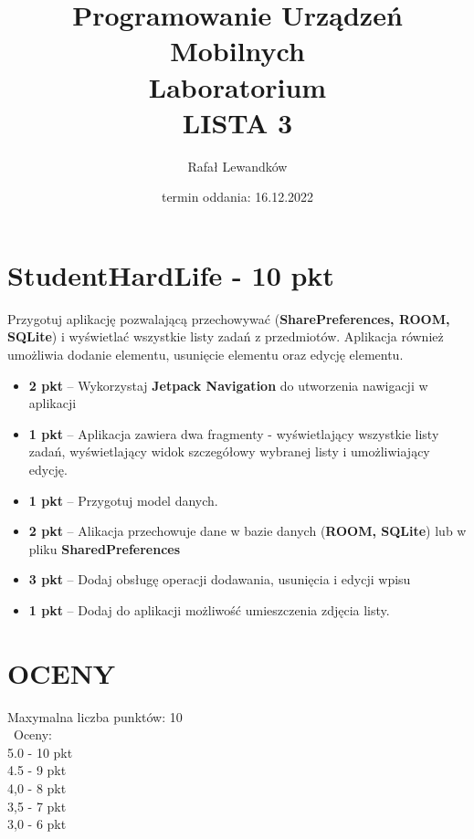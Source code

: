 \documentclass[a4paper]{article}
\title{Programowanie Urządzeń Mobilnych \\ Laboratorium \\ \textbf{LISTA 3}}
\author{Rafał Lewandków}
\date{termin oddania: 16.12.2022}
\begin{document}
\maketitle
    

\section*{StudentHardLife - 10 pkt}

Przygotuj aplikację pozwalającą przechowywać (\textbf{SharePreferences, ROOM, SQLite}) i wyświetlać wszystkie listy zadań z przedmiotów. Aplikacja również umożliwia dodanie elementu, usunięcie elementu oraz edycję elementu. 

\begin{itemize}
\item \textbf{2 pkt} -- Wykorzystaj \textbf{Jetpack Navigation} do utworzenia nawigacji w aplikacji

\item \textbf{1 pkt} -- Aplikacja zawiera dwa fragmenty - wyświetlający wszystkie listy zadań, wyświetlający widok szczegółowy wybranej listy i umożliwiający edycję.

\item \textbf{1 pkt} -- Przygotuj model danych.

\item \textbf{2 pkt} -- Alikacja przechowuje dane w bazie danych (\textbf{ROOM, SQLite}) lub w pliku \textbf{SharedPreferences}

\item \textbf{3 pkt} -- Dodaj obsługę operacji dodawania, usunięcia i edycji wpisu

\item \textbf{1 pkt} -- Dodaj do aplikacji możliwość umieszczenia zdjęcia listy.
\end{itemize}

\section*{OCENY}
Maxymalna liczba punktów: 10\\\
Oceny:\\
5.0 - 10 pkt\\
4.5 - 9 pkt\\
4,0 - 8 pkt\\
3,5 - 7 pkt\\
3,0 - 6 pkt
\end{document}
